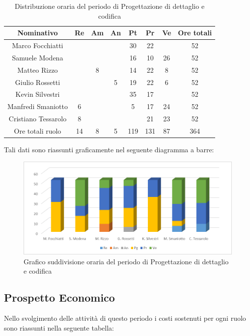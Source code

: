 \documentclass[./PianodiProgetto.tex]{subfiles}
\begin{document}
\begin{table}[H]
	\centering
	\begin{tabular}{|c|cccccc|c|}
		\hline
		Nominativo&Re&Am&An&Pt&Pr&Ve&Ore totali\\ \hline
		Marco Focchiatti& & & &30&22& &52 \\ \hline
		Samuele Modena& & & &16&10&26&52 \\ \hline
		Matteo Rizzo& &8& &14&22&8&52 \\ \hline
		Giulio Rossetti& & &5&19&22&6&52 \\ \hline
		Kevin Silvestri& & & &35&17& &52 \\ \hline
		Manfredi Smaniotto&6& & &5&17&24&52 \\ \hline
		Cristiano Tessarolo&8& & & &21&23&52 \\  \hline
		Ore totali ruolo&14&8&5&119&131&87&364 \\ \hline
	\end{tabular}
	\caption{Distribuzione oraria del periodo di Progettazione di dettaglio e codifica}
\end{table}

Tali dati sono riassunti graficamente nel seguente diagramma a barre:
\begin{figure}[H]
	\centering
	\includegraphics[width=1\linewidth]{img/grafici/ProgettazioneDettaglioCodificaProspettoOrario}
	\caption{Grafico suddivisione oraria del periodo di Progettazione di dettaglio e codifica}
	\label{fig:progettazione-dettaglio-codifica-prospetto-orario}
\end{figure}

\subsection{Prospetto Economico}
Nello svolgimento delle attività di questo periodo i costi sostenuti per ogni ruolo sono riassunti nella seguente tabella:
\end{document}
